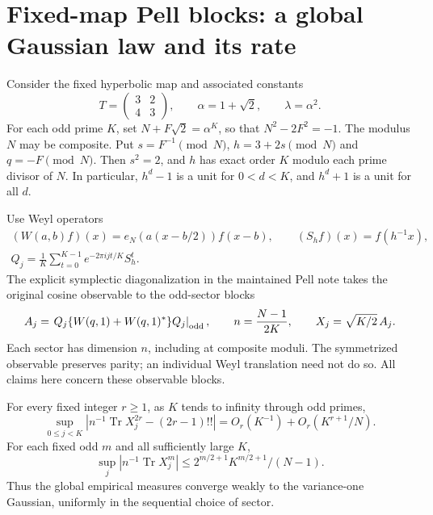 \section{Fixed-map Pell blocks: a global Gaussian law and its rate}
\label{sec:pell}

Consider the fixed hyperbolic map and associated constants
\[
 T=\begin{pmatrix}3&2\\4&3\end{pmatrix},\qquad
 \alpha=1+\sqrt2,\qquad\lambda=\alpha^2.
\]
For each odd prime $K$, set $N+F\sqrt2=\alpha^K$, so that
$N^2-2F^2=-1$. The modulus $N$ may be composite. Put
$s=F^{-1}\pmod N$, $h=3+2s\pmod N$ and $q=-F\pmod N$.
Then $s^2=2$, and $h$ has exact order $K$ modulo each prime divisor of $N$.
In particular, $h^d-1$ is a unit for $0<d<K$, and $h^d+1$ is a unit for all $d$.

Use Weyl operators
\[
 \begin{gathered}
 (W(a,b)f)(x)=e_N(a(x-b/2))f(x-b),\qquad
 (S_hf)(x)=f(h^{-1}x),\\
 Q_j=\frac1K\sum_{t=0}^{K-1}e^{-2\pi ijt/K}S_h^t.
 \end{gathered}
\]
The explicit symplectic diagonalization in the maintained Pell note takes
the original cosine observable to the odd-sector blocks
\[
 A_j=\left.Q_j\{W(q,1)+W(q,1)^*\}Q_j\right|_{\rm odd},
 \qquad n=\frac{N-1}{2K},\qquad X_j=\sqrt{K/2}\,A_j.
\]
Each sector has dimension $n$, including at composite moduli.
The symmetrized observable preserves parity; an individual Weyl translation
need not do so. All claims here concern these observable blocks.

\begin{theorem}
For every fixed integer $r\ge1$, as $K$ tends to infinity through odd primes,
\[
 \sup_{0\le j<K}\left|n^{-1}\operatorname{Tr} X_j^{2r}-(2r-1)!!\right|
 =O_r(K^{-1})+O_r(K^{r+1}/N).
\]
For each fixed odd $m$ and all sufficiently large $K$,
\[
 \sup_j |n^{-1}\operatorname{Tr} X_j^m|
 \le 2^{m/2+1}K^{m/2+1}/(N-1).
\]
Thus the global empirical measures converge weakly to the variance-one
Gaussian, uniformly in the sequential choice of sector.
\end{theorem}

